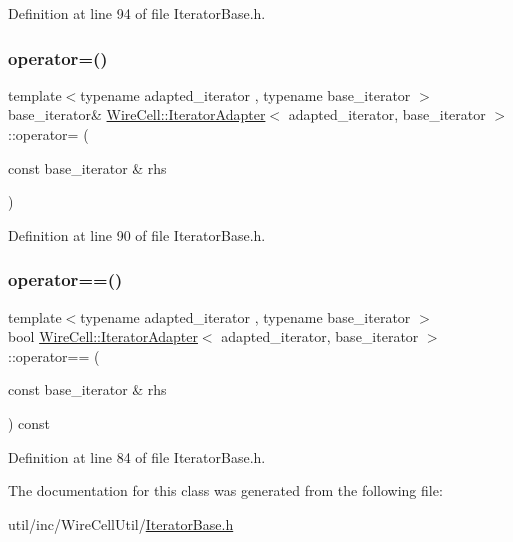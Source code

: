 Definition at line 94 of file Iterator\+Base.\+h.

\mbox{\label{class_wire_cell_1_1_iterator_adapter_a66731e2bbad5dcdcb37d78cb10865bea}} 
\subsubsection{\texorpdfstring{operator=()}{operator=()}}
{\footnotesize\ttfamily template$<$typename adapted\+\_\+iterator , typename base\+\_\+iterator $>$ \\
base\+\_\+iterator\& \hyperlink{class_wire_cell_1_1_iterator_adapter}{Wire\+Cell\+::\+Iterator\+Adapter}$<$ adapted\+\_\+iterator, base\+\_\+iterator $>$\+::operator= (\begin{DoxyParamCaption}\item[{const base\+\_\+iterator \&}]{rhs }\end{DoxyParamCaption})\hspace{0.3cm}{\ttfamily [inline]}}



Definition at line 90 of file Iterator\+Base.\+h.

\mbox{\label{class_wire_cell_1_1_iterator_adapter_a3f4f894ddaeed9584b3994089e77383b}} 
\subsubsection{\texorpdfstring{operator==()}{operator==()}}
{\footnotesize\ttfamily template$<$typename adapted\+\_\+iterator , typename base\+\_\+iterator $>$ \\
bool \hyperlink{class_wire_cell_1_1_iterator_adapter}{Wire\+Cell\+::\+Iterator\+Adapter}$<$ adapted\+\_\+iterator, base\+\_\+iterator $>$\+::operator== (\begin{DoxyParamCaption}\item[{const base\+\_\+iterator \&}]{rhs }\end{DoxyParamCaption}) const\hspace{0.3cm}{\ttfamily [inline]}}



Definition at line 84 of file Iterator\+Base.\+h.



The documentation for this class was generated from the following file\+:\begin{DoxyCompactItemize}
\item 
util/inc/\+Wire\+Cell\+Util/\hyperlink{_iterator_base_8h}{Iterator\+Base.\+h}\end{DoxyCompactItemize}
